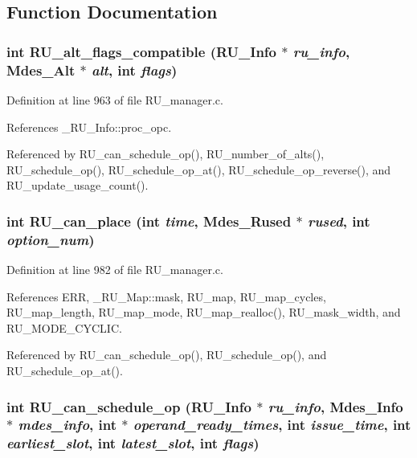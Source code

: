 \subsection{Function Documentation}
\subsubsection{\setlength{\rightskip}{0pt plus 5cm}int RU\_\-alt\_\-flags\_\-compatible (\bf{RU\_\-Info} $\ast$ {\em ru\_\-info}, Mdes\_\-Alt $\ast$ {\em alt}, int {\em flags})}\label{RU__manager_8c_279cb324520a5ca67d29a98a6e04fa75}




Definition at line 963 of file RU\_\-manager.c.

References \_\-RU\_\-Info::proc\_\-opc.

Referenced by RU\_\-can\_\-schedule\_\-op(), RU\_\-number\_\-of\_\-alts(), RU\_\-schedule\_\-op(), RU\_\-schedule\_\-op\_\-at(), RU\_\-schedule\_\-op\_\-reverse(), and RU\_\-update\_\-usage\_\-count().
\subsubsection{\setlength{\rightskip}{0pt plus 5cm}int RU\_\-can\_\-place (int {\em time}, Mdes\_\-Rused $\ast$ {\em rused}, int {\em option\_\-num})}\label{RU__manager_8c_559445243def88381c49a1d653f25e77}




Definition at line 982 of file RU\_\-manager.c.

References ERR, \_\-RU\_\-Map::mask, RU\_\-map, RU\_\-map\_\-cycles, RU\_\-map\_\-length, RU\_\-map\_\-mode, RU\_\-map\_\-realloc(), RU\_\-mask\_\-width, and RU\_\-MODE\_\-CYCLIC.

Referenced by RU\_\-can\_\-schedule\_\-op(), RU\_\-schedule\_\-op(), and RU\_\-schedule\_\-op\_\-at().
\subsubsection{\setlength{\rightskip}{0pt plus 5cm}int RU\_\-can\_\-schedule\_\-op (\bf{RU\_\-Info} $\ast$ {\em ru\_\-info}, Mdes\_\-Info $\ast$ {\em mdes\_\-info}, int $\ast$ {\em operand\_\-ready\_\-times}, int {\em issue\_\-time}, int {\em earliest\_\-slot}, int {\em latest\_\-slot}, int {\em flags})}\label{RU__manager_8c_2a33fab35682d96de7b2bf14a3d3ce51}




